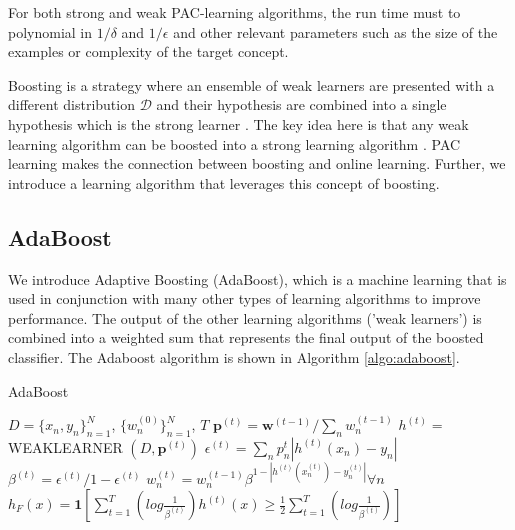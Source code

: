 \documentclass[11pt]{article}
\begin{document}
\normalfont

For both strong and weak PAC-learning algorithms, the run time must to polynomial in $1/\delta$ and $1/\epsilon$ and other relevant parameters such as the size of the examples or complexity of the target concept.

Boosting is a strategy where an ensemble of weak learners are presented with a different distribution $\mathcal{D}$ and their hypothesis are combined into a single hypothesis which is the strong learner \cite{hyp_boosting}. The key idea here is that any weak learning algorithm can be boosted into a strong learning algorithm \cite{boosting}. PAC learning makes the connection between boosting and online learning. Further, we introduce a learning algorithm that leverages this concept of boosting.

\subsection{AdaBoost}

We introduce Adaptive Boosting (AdaBoost), which is a machine learning that is used in conjunction with many other types of learning algorithms to improve performance. The output of the other learning algorithms ('weak learners') is combined into a weighted sum that represents the final output of the boosted classifier\cite{wiki_adap}. The Adaboost algorithm is shown in Algorithm \ref{algo:adaboost}. 

\begin{algorithm}[H]
\caption{AdaBoost\cite{adaboost}}
\label{algo:adaboost}
\begin{algorithmic}[1]
\REQUIRE $D=\{x_n, y_n\}_{n=1}^N$, $\{w_n^{(0)}\}_{n=1}^N$, $T$
\STATE $\mathbf{p}^{(t)} = \mathbf{w}^{(t-1)} / \sum_{n} w_n^{(t-1)}$
\STATE $h^{(t)} = $ WEAKLEARNER $(D, \mathbf{p}^{(t)})$
\STATE $\epsilon^{(t)} = \sum_n p_n^t | h^{(t)} (x_n) - y_n | $
\STATE $\beta^{(t)} = \epsilon^{(t)} / 1 - \epsilon^{(t)}$
\STATE $w_n^{(t)} = w_n^{(t-1)} \beta^{1 - |h^{(t)} (x_n^{(t)}) -y_n^{(t)} |} \forall n$
\ENDFOR
\STATE $h_F(x) = \mathbf{1}[\sum_{t=1}^T (log \frac{1}{\beta^{(t)}}) h^{(t)} (x) \ge \frac{1}{2} \sum_{t=1}^T (log \frac{1}{\beta^{(t)}})]$
\end{algorithmic}
\end{algorithm}
\end{document}

